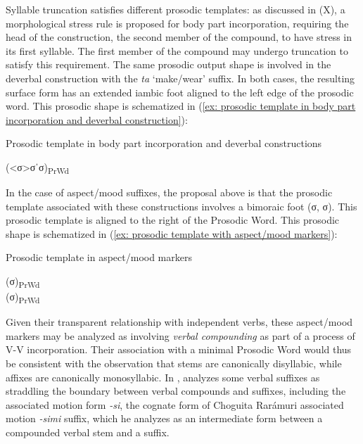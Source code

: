 Syllable truncation satisfies different prosodic templates: as discussed in (X), a morphological stress rule is proposed for body part incorporation, requiring the head of the construction, the second member of the compound, to have stress in its first syllable. The first member of the compound may undergo truncation to satisfy this requirement. The same prosodic output shape is involved in the deverbal construction with the \textit{ta} `make/wear' suffix. In both cases, the resulting surface form has an extended iambic foot aligned to the left edge of the prosodic word. This prosodic shape is schematized in (\ref{ex: prosodic template in body part incorporation and deverbal construction}):

\ea\label{ex: prosodic template in body part incorporation and deverbal construction}
{Prosodic template in body part incorporation and deverbal constructions}

(<σ>σˈσ)\textsubscript{PrWd}

\z

In the case of aspect/mood suffixes, the proposal above is that the prosodic template associated with these constructions involves a bimoraic foot (σ\textmu\textmu, σ\textmu). This prosodic template is aligned to the right of the Prosodic Word. This prosodic shape is schematized in (\ref{ex: prosodic template with aspect/mood markers}):

\ea\label{ex: prosodic template with aspect/mood markers}
{Prosodic template in aspect/mood markers}

(σ\textmu)\textsubscript{PrWd}\\
(σ\textmu\textmu)\textsubscript{PrWd}\\


\z


Given their transparent relationship with independent verbs, these aspect{\slash}mood markers may be analyzed as involving \textit{verbal compounding} as part of a process of V-V incorporation. Their association with a minimal Prosodic Word would thus be consistent with the observation that stems are canonically disyllabic, while affixes are canonically monosyllabic. In , \citet{miller1996guarijio} analyzes some verbal suffixes as straddling the boundary between verbal compounds and suffixes, including the associated motion form \textit{-si}, the cognate form of Choguita Rarámuri associated motion \textit{-simi} suffix, which he analyzes as an intermediate form between a compounded verbal stem and a suffix.


